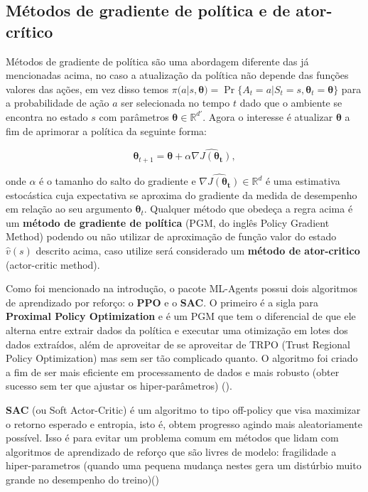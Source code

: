 \subsection{Métodos de gradiente de política e de ator-crítico}
Métodos de gradiente de política são uma abordagem diferente das já mencionadas acima, no caso a atualização da política não depende das funções valores das ações, em vez disso temos $\pi(a|s, \mathbf{\theta}) = \Pr\{A_t = a | S_t = s, \mathbf{\theta}_t = \mathbf{\theta}\}$ para  a probabilidade de ação $a$ ser selecionada  no tempo $t$ dado que o ambiente se encontra no estado $s$ com parâmetros $\mathbf{\theta} \in \mathbb{R}^{d'}$. Agora o interesse é atualizar $\mathbf{\theta}$ a fim de aprimorar a política da seguinte forma:

\begin{equation}
   \mathbf{\theta}_{t+1} = \mathbf{\theta} + \alpha \widehat{\nabla J (\mathbf{\theta_t})},
\end{equation}

onde $\alpha$ é o tamanho do salto do gradiente e $\widehat{\nabla J (\mathbf{\theta_t})} \in \mathbb{R}^d$ é uma estimativa estocástica cuja expectativa se aproxima do gradiente da medida de desempenho em relação ao seu argumento $\mathbf{\theta}_t$. Qualquer método que obedeça a regra acima é um \textbf{método de gradiente de política} (PGM, do inglês Policy Gradient Method) podendo ou não utilizar de aproximação de função valor do estado $\hat{v}(s)$ descrito acima, caso utilize será considerado um \textbf{método de ator-critico} (actor-critic method). 

Como foi mencionado na introdução, o pacote ML-Agents possui dois algoritmos de aprendizado por reforço: o \textbf{PPO} e o \textbf{SAC}. O primeiro é a sigla para \textbf{Proximal Policy Optimization} e é um PGM que tem o diferencial de que ele alterna entre extrair dados da política e executar uma otimização em lotes dos dados extraídos, além de aproveitar de se aproveitar de TRPO (Trust Regional Policy Optimization) mas sem ser tão complicado quanto. O algoritmo foi criado a fim de ser mais eficiente em processamento de dados e mais robusto (obter sucesso sem ter que ajustar os hiper-parâmetros) ().

\textbf{SAC} (ou Soft Actor-Critic) é um algoritmo to tipo off-policy que visa maximizar o retorno esperado e entropia, isto é, obtem progresso agindo mais aleatoriamente possível. Isso é para evitar um problema comum em métodos que lidam com algoritmos de aprendizado de reforço que são livres de modelo: fragilidade a hiper-parametros (quando uma pequena mudança nestes gera um distúrbio muito grande no desempenho do treino)()


